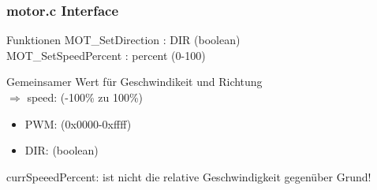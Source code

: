 \documentclass{beamer}
\begin{document}
\begin{frame}
		\frametitle{motor.c Interface}
		
		\begin{block}{Funktionen}
			MOT\_SetDirection : DIR (boolean)\\
			MOT\_SetSpeedPercent : percent (0-100)
		\end{block}

		\begin{block}{}
			Gemeinsamer Wert für Geschwindikeit und Richtung\\ $\Rightarrow$ speed: (-100\% zu 100\%)
			\begin{itemize}
				\item{PWM: (0x0000-0xffff)}
				\item{DIR: (boolean)}
			\end{itemize}
		\end{block}
		\begin{alertblock}{}
			currSpeeedPercent: ist nicht die relative Geschwindigkeit gegenüber Grund!
		\end{alertblock}
\end{frame}
\end{document}
